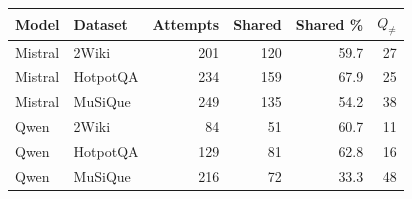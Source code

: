 \begin{tabular}{@{}llrrrr@{}}
\toprule
Model & Dataset & Attempts & Shared & Shared \% & $Q_{\neq}$ \\
\midrule
Mistral & 2Wiki & 201 & 120 & 59.7 & 27 \\
Mistral & HotpotQA & 234 & 159 & 67.9 & 25 \\
Mistral & MuSiQue & 249 & 135 & 54.2 & 38 \\
Qwen & 2Wiki & 84 & 51 & 60.7 & 11 \\
Qwen & HotpotQA & 129 & 81 & 62.8 & 16 \\
Qwen & MuSiQue & 216 & 72 & 33.3 & 48 \\
\bottomrule
\end{tabular}
